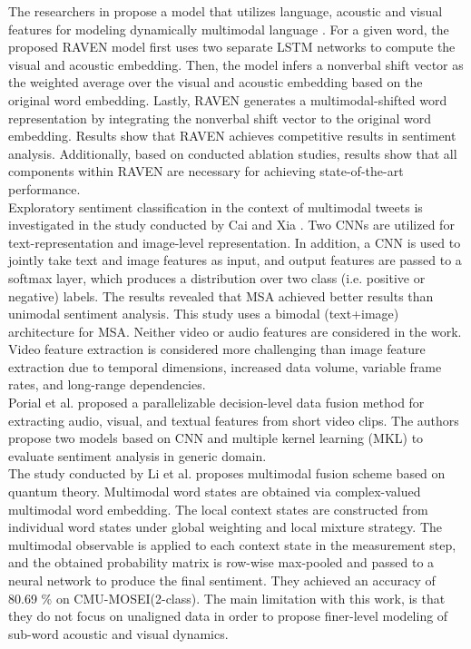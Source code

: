 The researchers in \cite{Wang2018} propose a model that utilizes language, acoustic and visual features for modeling dynamically multimodal language \cite{HP_RPP} \cite{HP_Advanced}. For a given word, the proposed RAVEN model first uses two separate LSTM networks to compute the visual and acoustic embedding. Then, the model infers a nonverbal shift vector as the weighted average  over the visual and acoustic embedding based on the original word embedding. Lastly, RAVEN generates a  multimodal-shifted word representation by integrating the nonverbal shift vector to the original word embedding. Results show that RAVEN achieves competitive results in sentiment analysis. Additionally, based on conducted ablation studies, results show that all components within RAVEN are necessary for achieving state-of-the-art performance. \\

Exploratory sentiment classification in the context of multimodal tweets is investigated in the study conducted by Cai and Xia \cite{late_fusion_cai2015convolutional}. Two CNNs are utilized for text-representation and image-level representation. In addition, a CNN is used to jointly take text and image features as input, and output features are passed to a softmax layer, which produces a distribution over two class (i.e. positive or negative) labels. The results revealed that MSA achieved better results than unimodal sentiment analysis. This study uses a bimodal (text+image) architecture for MSA. Neither video or audio features are considered in the work. Video feature extraction is considered more challenging than image feature extraction due to temporal dimensions, increased data volume, variable frame rates, and long-range dependencies. \\

Porial et al. \cite{hybrid_fusion_poria2015deep} proposed a parallelizable decision-level data fusion method for extracting audio, visual, and textual features from short video clips. The authors propose two models based on CNN and multiple kernel learning (MKL) to evaluate sentiment analysis in generic domain.  \\

The study conducted by Li et al. \cite{quantum_based_fusion_LI202158} proposes multimodal fusion scheme based on quantum theory. Multimodal word states are obtained via complex-valued multimodal word embedding. The local context states are constructed from individual word states under global weighting and local mixture strategy. The multimodal observable is applied to each context state in the measurement step, and the obtained probability matrix is row-wise max-pooled and passed to a neural network to produce the final sentiment. They achieved an accuracy of 80.69 \% on CMU-MOSEI(2-class). The main limitation with this work, is that they do not focus on unaligned data in order to propose finer-level modeling of sub-word acoustic
and visual dynamics. \\


